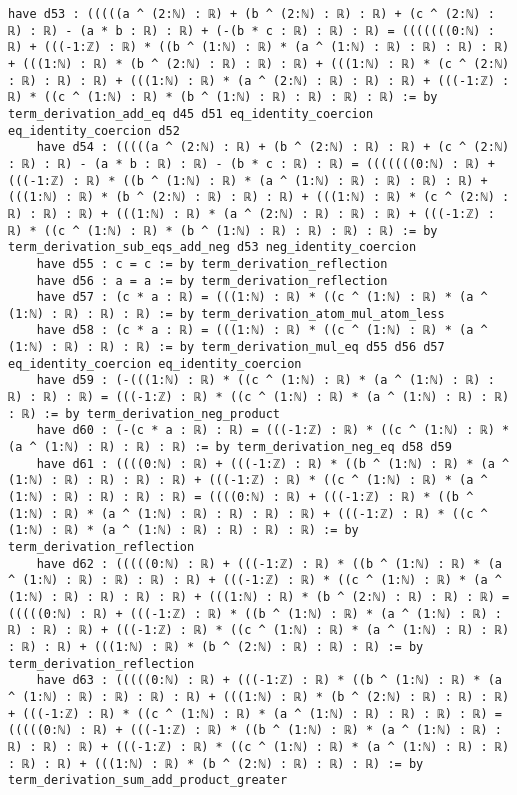 \documentclass{article}
\begin{document}
\begin{tcolorbox}[colback=white!10, width=\linewidth]
\begin{lstlisting}[language=Lean4]
    have d53 : (((((a ^ (2:ℕ) : ℝ) + (b ^ (2:ℕ) : ℝ) : ℝ) + (c ^ (2:ℕ) : ℝ) : ℝ) - (a * b : ℝ) : ℝ) + (-(b * c : ℝ) : ℝ) : ℝ) = (((((((0:ℕ) : ℝ) + (((-1:ℤ) : ℝ) * ((b ^ (1:ℕ) : ℝ) * (a ^ (1:ℕ) : ℝ) : ℝ) : ℝ) : ℝ) + (((1:ℕ) : ℝ) * (b ^ (2:ℕ) : ℝ) : ℝ) : ℝ) + (((1:ℕ) : ℝ) * (c ^ (2:ℕ) : ℝ) : ℝ) : ℝ) + (((1:ℕ) : ℝ) * (a ^ (2:ℕ) : ℝ) : ℝ) : ℝ) + (((-1:ℤ) : ℝ) * ((c ^ (1:ℕ) : ℝ) * (b ^ (1:ℕ) : ℝ) : ℝ) : ℝ) : ℝ) := by term_derivation_add_eq d45 d51 eq_identity_coercion eq_identity_coercion d52
    have d54 : (((((a ^ (2:ℕ) : ℝ) + (b ^ (2:ℕ) : ℝ) : ℝ) + (c ^ (2:ℕ) : ℝ) : ℝ) - (a * b : ℝ) : ℝ) - (b * c : ℝ) : ℝ) = (((((((0:ℕ) : ℝ) + (((-1:ℤ) : ℝ) * ((b ^ (1:ℕ) : ℝ) * (a ^ (1:ℕ) : ℝ) : ℝ) : ℝ) : ℝ) + (((1:ℕ) : ℝ) * (b ^ (2:ℕ) : ℝ) : ℝ) : ℝ) + (((1:ℕ) : ℝ) * (c ^ (2:ℕ) : ℝ) : ℝ) : ℝ) + (((1:ℕ) : ℝ) * (a ^ (2:ℕ) : ℝ) : ℝ) : ℝ) + (((-1:ℤ) : ℝ) * ((c ^ (1:ℕ) : ℝ) * (b ^ (1:ℕ) : ℝ) : ℝ) : ℝ) : ℝ) := by term_derivation_sub_eqs_add_neg d53 neg_identity_coercion
    have d55 : c = c := by term_derivation_reflection
    have d56 : a = a := by term_derivation_reflection
    have d57 : (c * a : ℝ) = (((1:ℕ) : ℝ) * ((c ^ (1:ℕ) : ℝ) * (a ^ (1:ℕ) : ℝ) : ℝ) : ℝ) := by term_derivation_atom_mul_atom_less
    have d58 : (c * a : ℝ) = (((1:ℕ) : ℝ) * ((c ^ (1:ℕ) : ℝ) * (a ^ (1:ℕ) : ℝ) : ℝ) : ℝ) := by term_derivation_mul_eq d55 d56 d57 eq_identity_coercion eq_identity_coercion
    have d59 : (-(((1:ℕ) : ℝ) * ((c ^ (1:ℕ) : ℝ) * (a ^ (1:ℕ) : ℝ) : ℝ) : ℝ) : ℝ) = (((-1:ℤ) : ℝ) * ((c ^ (1:ℕ) : ℝ) * (a ^ (1:ℕ) : ℝ) : ℝ) : ℝ) := by term_derivation_neg_product
    have d60 : (-(c * a : ℝ) : ℝ) = (((-1:ℤ) : ℝ) * ((c ^ (1:ℕ) : ℝ) * (a ^ (1:ℕ) : ℝ) : ℝ) : ℝ) := by term_derivation_neg_eq d58 d59
    have d61 : ((((0:ℕ) : ℝ) + (((-1:ℤ) : ℝ) * ((b ^ (1:ℕ) : ℝ) * (a ^ (1:ℕ) : ℝ) : ℝ) : ℝ) : ℝ) + (((-1:ℤ) : ℝ) * ((c ^ (1:ℕ) : ℝ) * (a ^ (1:ℕ) : ℝ) : ℝ) : ℝ) : ℝ) = ((((0:ℕ) : ℝ) + (((-1:ℤ) : ℝ) * ((b ^ (1:ℕ) : ℝ) * (a ^ (1:ℕ) : ℝ) : ℝ) : ℝ) : ℝ) + (((-1:ℤ) : ℝ) * ((c ^ (1:ℕ) : ℝ) * (a ^ (1:ℕ) : ℝ) : ℝ) : ℝ) : ℝ) := by term_derivation_reflection
    have d62 : (((((0:ℕ) : ℝ) + (((-1:ℤ) : ℝ) * ((b ^ (1:ℕ) : ℝ) * (a ^ (1:ℕ) : ℝ) : ℝ) : ℝ) : ℝ) + (((-1:ℤ) : ℝ) * ((c ^ (1:ℕ) : ℝ) * (a ^ (1:ℕ) : ℝ) : ℝ) : ℝ) : ℝ) + (((1:ℕ) : ℝ) * (b ^ (2:ℕ) : ℝ) : ℝ) : ℝ) = (((((0:ℕ) : ℝ) + (((-1:ℤ) : ℝ) * ((b ^ (1:ℕ) : ℝ) * (a ^ (1:ℕ) : ℝ) : ℝ) : ℝ) : ℝ) + (((-1:ℤ) : ℝ) * ((c ^ (1:ℕ) : ℝ) * (a ^ (1:ℕ) : ℝ) : ℝ) : ℝ) : ℝ) + (((1:ℕ) : ℝ) * (b ^ (2:ℕ) : ℝ) : ℝ) : ℝ) := by term_derivation_reflection
    have d63 : (((((0:ℕ) : ℝ) + (((-1:ℤ) : ℝ) * ((b ^ (1:ℕ) : ℝ) * (a ^ (1:ℕ) : ℝ) : ℝ) : ℝ) : ℝ) + (((1:ℕ) : ℝ) * (b ^ (2:ℕ) : ℝ) : ℝ) : ℝ) + (((-1:ℤ) : ℝ) * ((c ^ (1:ℕ) : ℝ) * (a ^ (1:ℕ) : ℝ) : ℝ) : ℝ) : ℝ) = (((((0:ℕ) : ℝ) + (((-1:ℤ) : ℝ) * ((b ^ (1:ℕ) : ℝ) * (a ^ (1:ℕ) : ℝ) : ℝ) : ℝ) : ℝ) + (((-1:ℤ) : ℝ) * ((c ^ (1:ℕ) : ℝ) * (a ^ (1:ℕ) : ℝ) : ℝ) : ℝ) : ℝ) + (((1:ℕ) : ℝ) * (b ^ (2:ℕ) : ℝ) : ℝ) : ℝ) := by term_derivation_sum_add_product_greater

\end{lstlisting}
\end{tcolorbox}
\end{document}
